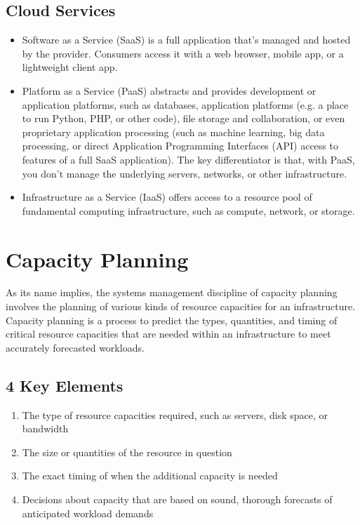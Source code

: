 \documentclass[a4]{article}
\begin{document}
\begin{multicols}{3}
\subsection{Cloud Services}
\begin{itemize}
\item Software as a Service (SaaS) is a full application that’s managed and
hosted by the provider. Consumers access it with a web browser,
mobile app, or a lightweight client app.
\item Platform as a Service (PaaS) abstracts and provides development or
application platforms, such as databases, application platforms (e.g. a
place to run Python, PHP, or other code), file storage and
collaboration, or even proprietary application processing (such as
machine learning, big data processing, or direct Application
Programming Interfaces (API) access to features of a full SaaS
application). The key differentiator is that, with PaaS, you don’t
manage the underlying servers, networks, or other infrastructure.
\item Infrastructure as a Service (IaaS) offers access to a resource pool of
fundamental computing infrastructure, such as compute, network, or
storage.
\end{itemize}

\section{Capacity Planning}
As its name implies, the systems management discipline of capacity planning involves the planning of various kinds
of resource capacities for an infrastructure. \\
Capacity planning is a process to predict the types, quantities, and timing of critical resource capacities that are 
needed within an infrastructure to meet accurately forecasted workloads.\\
\subsection{4 Key Elements}
\begin{enumerate}
    \item The type of resource capacities required, such as servers, disk space, or bandwidth
    \item The size or quantities of the resource in question
    \item The exact timing of when the additional capacity is needed
    \item Decisions about capacity that are based on sound, thorough forecasts of anticipated workload demands
\end{enumerate}


\end{multicols}
\end{document}
